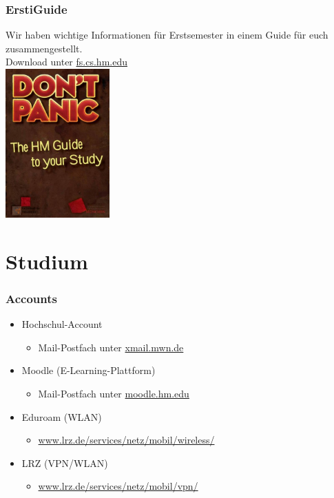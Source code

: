 \documentclass{beamer}
\begin{document}
	\begin{frame}[t]
		\frametitle{ErstiGuide}
		Wir haben wichtige Informationen für Erstsemester in einem Guide für euch zusammengestellt.\\
		\bigskip
		Download unter \url{fs.cs.hm.edu}\\
		\center
		\includegraphics[width=0.3\textwidth]{erstiguide.jpg}
	\end{frame}
	
	\section{Studium}
	
	\begin{frame}[t]
		\frametitle{Accounts}
		\begin{itemize}
			\item Hochschul-Account
			\begin{itemize}
				\item Mail-Postfach unter \url{xmail.mwn.de}
			\end{itemize}
			\pause
			\item Moodle (E-Learning-Plattform)
			\begin{itemize}
				\item Mail-Postfach unter \url{moodle.hm.edu}
			\end{itemize}
			\pause
			\item Eduroam (WLAN)
			\begin{itemize}
				\item \url{www.lrz.de/services/netz/mobil/wireless/}
			\end{itemize}
			\pause
			\item LRZ (VPN/WLAN)
			\begin{itemize}
				\item \url{www.lrz.de/services/netz/mobil/vpn/}
			\end{itemize}
		\end{itemize}
	\end{frame}
	
\end{document}
